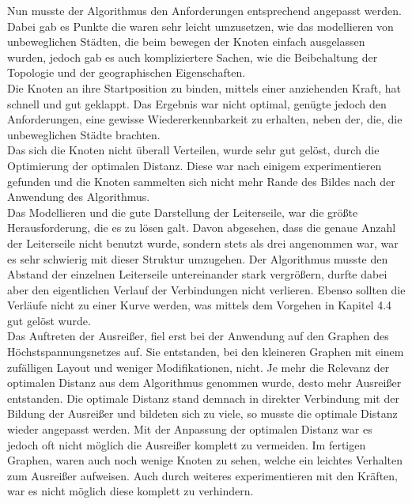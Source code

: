 Nun musste der Algorithmus den Anforderungen entsprechend angepasst werden. Dabei gab es Punkte die waren sehr leicht umzusetzen, wie das modellieren von unbeweglichen Städten, die beim bewegen der Knoten einfach ausgelassen wurden, jedoch gab es auch kompliziertere Sachen, wie die Beibehaltung der Topologie und der geographischen Eigenschaften. \\

Die Knoten an ihre Startposition zu binden, mittels einer anziehenden Kraft, hat schnell und gut geklappt. Das Ergebnis war nicht optimal, genügte jedoch den Anforderungen, eine gewisse Wiedererkennbarkeit zu erhalten, neben der, die, die unbeweglichen Städte brachten.\\

Das sich die Knoten nicht überall Verteilen, wurde sehr gut gelöst, durch die Optimierung der optimalen Distanz. Diese war nach einigem experimentieren gefunden und die Knoten sammelten sich nicht mehr Rande des Bildes nach der Anwendung des Algorithmus. \\

Das Modellieren und die gute Darstellung der Leiterseile, war die größte Herausforderung, die es zu lösen galt. Davon abgesehen, dass die genaue Anzahl der Leiterseile nicht benutzt wurde, sondern stets als drei angenommen war, war es sehr schwierig mit dieser Struktur umzugehen. Der Algorithmus  musste den Abstand der einzelnen Leiterseile untereinander stark vergrößern, durfte dabei aber den eigentlichen Verlauf der Verbindungen nicht verlieren. Ebenso sollten die Verläufe nicht zu einer Kurve werden, was mittels dem Vorgehen in Kapitel 4.4 gut gelöst wurde. \\

Das Auftreten der Ausreißer, fiel erst bei der Anwendung auf den Graphen des Höchstspannungsnetzes auf. Sie entstanden, bei den kleineren Graphen mit einem zufälligen Layout und weniger Modifikationen, nicht. Je mehr die Relevanz der optimalen Distanz aus dem Algorithmus genommen wurde, desto mehr Ausreißer entstanden. Die optimale Distanz stand demnach in direkter Verbindung mit der Bildung der Ausreißer und bildeten sich zu viele, so musste die optimale Distanz wieder angepasst werden. Mit der Anpassung der optimalen Distanz war es jedoch oft nicht möglich die Ausreißer komplett zu vermeiden. Im fertigen Graphen, waren auch noch wenige Knoten zu sehen, welche ein leichtes Verhalten zum Ausreißer aufweisen. Auch durch weiteres experimentieren mit den Kräften, war es nicht möglich diese komplett zu verhindern. \\

